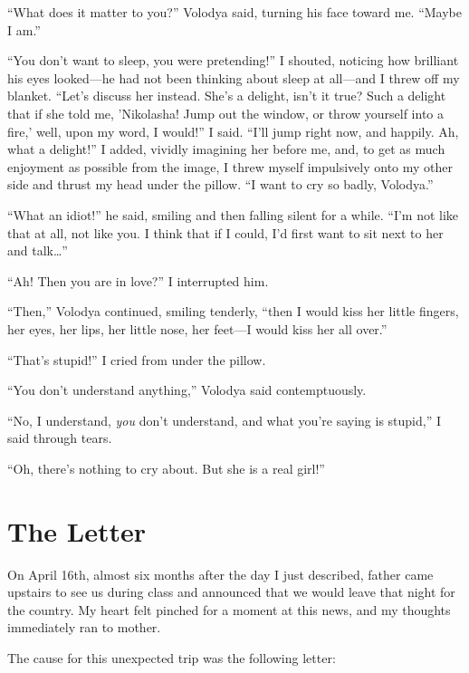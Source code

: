 ``What does it matter to you?'' Volodya said, turning his face toward me. ``Maybe I am.'' %

``You don't want to sleep, you were pretending!'' I shouted, noticing how brilliant his eyes looked---he had not been thinking about sleep at all---and I threw off my blanket. ``Let's discuss her instead. She's a delight, isn't it true? Such a delight that if she told me, 'Nikolasha! Jump out the window, or throw yourself into a fire,' well, upon my word, I would!'' I said. ``I'll jump right now, and happily. Ah, what a delight!'' I added, vividly imagining her before me, and, to get as much enjoyment as possible from the image, I threw myself impulsively onto my other side and thrust my head under the pillow. ``I want to cry so badly, Volodya.'' %

``What an idiot!'' he said, smiling and then falling silent for a while. ``I'm not like that at all, not like you. I think that if I could, I'd first want to sit next to her and talk\ldots{}'' %

``Ah! Then you are in love?'' I interrupted him. %

``Then,'' Volodya continued, smiling tenderly, ``then I would kiss her little fingers, her eyes, her lips, her little nose, her feet---I would kiss her all over.'' %

``That's stupid!'' I cried from under the pillow. %

``You don't understand anything,'' Volodya said contemptuously. %

``No, I understand, \emph{you} don't understand, and what you're saying is stupid,'' I said through tears. %

``Oh, there's nothing to cry about. But she is a real girl!'' %

\chapter{The Letter}

On April 16th, almost six months after the day I just described, father came upstairs to see us during class and announced that we would leave that night for the country. My heart felt pinched for a moment at this news, and my thoughts immediately ran to mother.

The cause for this unexpected trip was the following letter:

